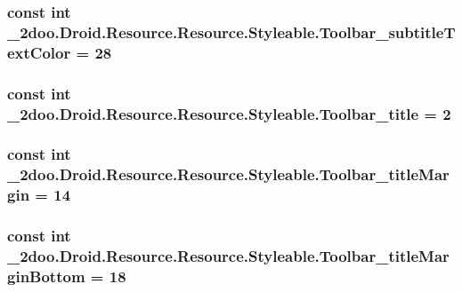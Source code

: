\hypertarget{class__2doo_1_1_droid_1_1_resource_1_1_styleable_0574fcbab26eb99af6b2fc6cf800b4d5}{
\subsubsection[{Toolbar\_\-subtitleTextColor}]{\setlength{\rightskip}{0pt plus 5cm}const int \_\-2doo.Droid.Resource.Resource.Styleable.Toolbar\_\-subtitleTextColor = 28}}
\label{class__2doo_1_1_droid_1_1_resource_1_1_styleable_0574fcbab26eb99af6b2fc6cf800b4d5}


\hypertarget{class__2doo_1_1_droid_1_1_resource_1_1_styleable_89a544d881af0a2bc745181cedc7b711}{
\subsubsection[{Toolbar\_\-title}]{\setlength{\rightskip}{0pt plus 5cm}const int \_\-2doo.Droid.Resource.Resource.Styleable.Toolbar\_\-title = 2}}
\label{class__2doo_1_1_droid_1_1_resource_1_1_styleable_89a544d881af0a2bc745181cedc7b711}


\hypertarget{class__2doo_1_1_droid_1_1_resource_1_1_styleable_a5fbd1c382553dcb297db1f1e12be105}{
\subsubsection[{Toolbar\_\-titleMargin}]{\setlength{\rightskip}{0pt plus 5cm}const int \_\-2doo.Droid.Resource.Resource.Styleable.Toolbar\_\-titleMargin = 14}}
\label{class__2doo_1_1_droid_1_1_resource_1_1_styleable_a5fbd1c382553dcb297db1f1e12be105}


\hypertarget{class__2doo_1_1_droid_1_1_resource_1_1_styleable_5822f4f15569c507add2ea63bee96dc2}{
\subsubsection[{Toolbar\_\-titleMarginBottom}]{\setlength{\rightskip}{0pt plus 5cm}const int \_\-2doo.Droid.Resource.Resource.Styleable.Toolbar\_\-titleMarginBottom = 18}}
\label{class__2doo_1_1_droid_1_1_resource_1_1_styleable_5822f4f15569c507add2ea63bee96dc2}


